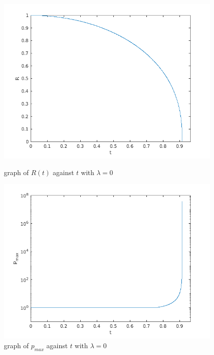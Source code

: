 \documentclass[10pt]{article}
\begin{document}
\begin{figure}[ht]
    \begin{minipage}[b]{0.48\linewidth}
            \centering
            \includegraphics[width=\textwidth]{q3/q3_R.png}
            \caption{graph of $R(t)$ against $t$ with $\lambda=0$}
        \end{minipage}
        \hfill
        \begin{minipage}[b]{0.48\linewidth}
            \centering
            \includegraphics[width=\textwidth]{q3/q3_p2.png}
            \caption{graph of $p_{max}$ against $t$ with $\lambda=0$}
        \end{minipage}
\end{figure}\\
\end{document}

